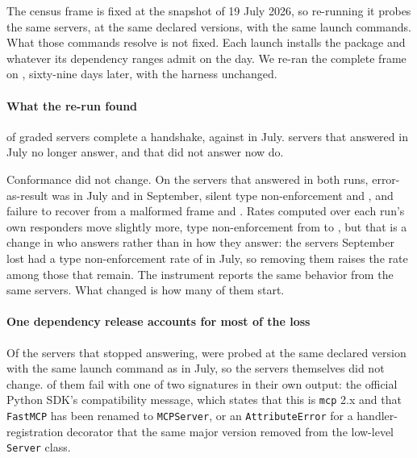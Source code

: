 \label{sec:rerun}

The census frame is fixed at the snapshot of 19 July 2026, so re-running it probes
the same servers, at the same declared versions, with the same launch commands. What
those commands resolve is not fixed. Each launch installs the package and whatever
its dependency ranges admit on the day. We re-ran the complete frame on \SeptDate{},
sixty-nine days later, with the harness unchanged.

\paragraph{What the re-run found}
\NSeptHandshake{} of \NSeptGraded{} graded servers complete a handshake,
\SeptHandshakeRate{} against \HandshakeRatePoint{} in July. \NLost{} servers that
answered in July no longer answer, and \NGained{} that did not answer now do.

Conformance did not change. On the \NPaired{} servers that answered in both runs,
error-as-result was \PairedEarBefore{} in July and \PairedEarAfter{} in September, silent
type non-enforcement \PairedTypeBefore{} and \PairedTypeAfter{}, and failure to recover
from a malformed frame \PairedMalBefore{} and \PairedMalAfter{}. Rates computed over each
run's own responders move slightly more, type non-enforcement from
\NoTypecheckRateCl{} to \SeptNoTypecheck{}, but that is a change in who answers rather
than in how they answer: the servers September lost had a type non-enforcement rate of
\LostTypeRate{} in July, so removing them raises the rate among those that remain. The
instrument reports the same behavior from the same servers. What changed is how many of
them start.

\paragraph{One dependency release accounts for most of the loss}
Of the \NLost{} servers that stopped answering, \NLostUnchanged{} were probed at the
same declared version with the same launch command as in July, so the servers
themselves did not change. \NSDKTwoBroke{} of them fail with one of two signatures in
their own output: the official Python SDK's compatibility message, which states that
this is \texttt{mcp} 2.x and that \texttt{FastMCP} has been renamed to
\texttt{MCPServer}, or an \texttt{AttributeError} for a handler-registration
decorator that the same major version removed from the low-level
\texttt{Server} class.

